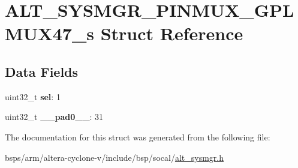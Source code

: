 \hypertarget{structALT__SYSMGR__PINMUX__GPLMUX47__s}{}\section{A\+L\+T\+\_\+\+S\+Y\+S\+M\+G\+R\+\_\+\+P\+I\+N\+M\+U\+X\+\_\+\+G\+P\+L\+M\+U\+X47\+\_\+s Struct Reference}
\label{structALT__SYSMGR__PINMUX__GPLMUX47__s}
\subsection*{Data Fields}
\begin{DoxyCompactItemize}
\item 
\mbox{\label{structALT__SYSMGR__PINMUX__GPLMUX47__s_a00e8f049cf9fbac1a0bbb2fc09b3ee8f}} 
uint32\+\_\+t {\bfseries sel}\+: 1
\item 
\mbox{\label{structALT__SYSMGR__PINMUX__GPLMUX47__s_ae36889f6539502e1abf4aaccda1062b7}} 
uint32\+\_\+t {\bfseries \+\_\+\+\_\+pad0\+\_\+\+\_\+}\+: 31
\end{DoxyCompactItemize}


The documentation for this struct was generated from the following file\+:\begin{DoxyCompactItemize}
\item 
bsps/arm/altera-\/cyclone-\/v/include/bsp/socal/\mbox{\hyperlink{alt__sysmgr_8h}{alt\+\_\+sysmgr.\+h}}\end{DoxyCompactItemize}
